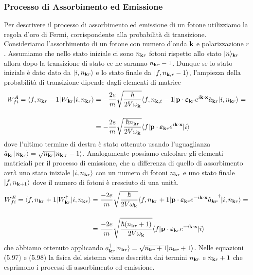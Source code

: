 \subsubsection{Processo di Assorbimento ed Emissione}
Per descrivere il processo di assorbimento ed emissione di un fotone utilizziamo la regola d'oro di Fermi, corrispondente alla probabilit\`a di transizione.
 Consideriamo l'assorbimento di un fotone con numero d'onda $\bold{k}$ e polarizzazione $r$. Assumiamo che nello stato iniziale ci sono $n_{\bold{k}r}$ fotoni  rispetto allo stato $|n \rangle_{\bold{k}r}$ allora dopo la transizione di stato ce ne saranno $n_{\bold{k}r}-1$. Dunque se lo stato iniziale \`e dato dato da $|i,n_{\bold{k}r} \rangle$ e lo stato finale da $|f,n_{\bold{k},r}-1\rangle$, l'ampiezza della probabilit\`a di transizione dipende dagli elementi di matrice 
\begin{align}
	W_{fi}^{A}=\langle f,n_{\bold{k}r}-1| W_{\bold{k}r} |i,n_{\bold{k}r}\rangle & = - \frac{2e}{m}\sqrt{\frac{\hbar}{2V\omega_\bold{k}}}\langle f,n_{\bold{k},t}-1|\bold{p} \cdot \boldsymbol{\varepsilon}_{\bold{k}r}e^{i \bold{k}\cdot \bold{x}}\hat{a}_{\bold{k}r}|i,n_{\bold{k}r} \rangle = \notag \\[0.4cm] 
	& = - \frac{2e}{m}\sqrt{\frac{\hbar n_{\bold{k}r}}{2V\omega_\bold{k}}}\langle f|\bold{p} \cdot \boldsymbol{\varepsilon}_{\bold{k}r}e^{i \bold{k}\cdot \bold{x}}|i \rangle
\end{align}
dove l'ultimo termine di destra \`e stato ottenuto usando l'uguaglianza $\hat{a}_{\bold{k}r}|n_{\bold{k}r}\rangle = \sqrt{n_{\bold{k}r}}|n_{\bold{k},r}-1\rangle $. Analogamente possiamo calcolare gli elementi matriciali per il processo di emissione, che a differenza di quello di assorbimento avr\`a uno stato iniziale $|i,n_{\bold{k}r} \rangle$ con un numero di fotoni $n_{\bold{k}r}$ e uno stato finale $|f,n_{\bold{k}+1 }\rangle$  dove il numero di fotoni \`e cresciuto di una unit\`a.
\begin{align}
	W_{fi}^E=\langle f, n_{\bold{k}r}+1|W_{\bold{k}r}^\dag |i,n_{\bold{k}r} \rangle  & = \frac{-2e}{m} \sqrt{\frac{\hbar}{2V \omega_{\bold{k}}}}\langle f, n_{\bold{k}r}+1|\bold{p}\cdot{\boldsymbol{\varepsilon}_{\bold{k}r}e^{-i \bold{k} \cdot \bold{x}}\hat{a}_{\boldsymbol{{k}r}}}^\dag|i,n_{\bold{k}r} \rangle = \notag \\[0.4cm]
	& = \frac{-2e}{m}\sqrt{\frac{\hbar (n_{\bold{k}r}+1)}{2V \omega_{\bold{k}}}}\langle f | \bold{p} \cdot \boldsymbol{\varepsilon}_{\bold{k}r}e^{-i \bold{k}\cdot \bold{x}}|i \rangle 
\end{align}
che abbiamo ottenuto applicando $a_{\bold{k}r}^{\dag}|n_{\bold{k}r} \rangle = \sqrt{n_{\bold{k}r}+1}|n_{\bold{k}r}+1 \rangle$.
Nelle equazioni (5.97) e (5.98) la fisica del sistema viene descritta dai termini $n_{\bold{k}r}$ e $n_{\bold{k}r}+1$ che esprimono i processi di assorbimento ed emissione. 

